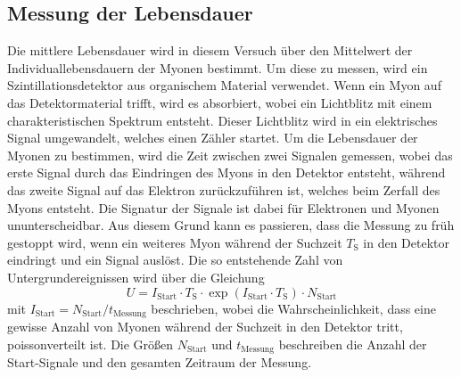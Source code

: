 \subsection{Messung der Lebensdauer}

Die mittlere Lebensdauer wird in diesem Versuch über den Mittelwert der Individuallebensdauern der Myonen bestimmt.
Um diese zu messen,
wird ein Szintillationsdetektor aus organischem Material verwendet.
Wenn ein Myon auf das Detektormaterial trifft,
wird es absorbiert,
wobei ein Lichtblitz mit einem charakteristischen Spektrum entsteht.
Dieser Lichtblitz wird in ein elektrisches Signal umgewandelt,
welches einen Zähler startet.
Um die Lebensdauer der Myonen zu bestimmen,
wird die Zeit zwischen zwei Signalen gemessen,
wobei das erste Signal durch das Eindringen des Myons in den Detektor entsteht,
während das zweite Signal auf das Elektron zurückzuführen ist,
welches beim Zerfall des Myons entsteht.
Die Signatur der Signale ist dabei für Elektronen und Myonen ununterscheidbar.
Aus diesem Grund kann es passieren,
dass die Messung zu früh gestoppt wird,
wenn ein weiteres Myon während der Suchzeit $T_\text{S}$ in den Detektor eindringt und ein Signal auslöst.
Die so entstehende Zahl von Untergrundereignissen wird über die Gleichung
\begin{equation}
    U = I_\text{Start} \cdot T_\text{S} \cdot \exp(I_\text{Start} \cdot T_\text{S}) \cdot N_\text{Start}
    \label{eqn:untergrund}
\end{equation}
mit $I_\text{Start} = N_\text{Start} / t_\text{Messung}$ beschrieben,
wobei die Wahrscheinlichkeit,
dass eine gewisse Anzahl von Myonen während der Suchzeit in den Detektor tritt,
poissonverteilt ist.
Die Größen $N_\text{Start}$ und $t_\text{Messung}$ beschreiben die Anzahl der Start-Signale und den gesamten Zeitraum der Messung.
